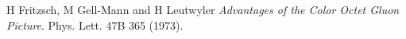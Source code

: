 \begin{thebibliography}{ABC}	
     H Fritzsch, M Gell-Mann and H Leutwyler \emph{Advantages of the Color Octet Gluon Picture}. Phys. Lett. 47B 365  (1973).
\end{thebibliography}
